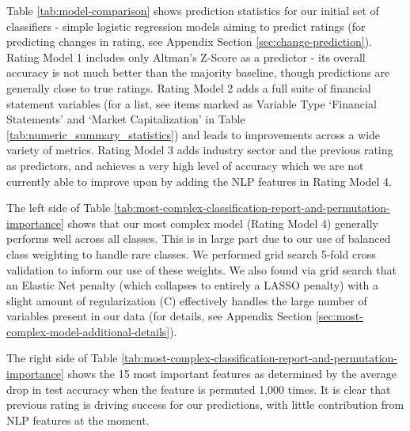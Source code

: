 \documentclass{article}[11pt]
\begin{document}
    Table \ref{tab:model-comparison} shows prediction statistics for our initial set of classifiers - simple logistic regression models aiming to predict ratings (for predicting changes in rating, see Appendix Section \ref{sec:change-prediction}). Rating Model 1 includes only Altman's Z-Score as a predictor - its overall accuracy is not much better than the majority baseline, though predictions are generally close to true ratings. Rating Model 2 adds a full suite of financial statement variables (for a list, see items marked as Variable Type `Financial Statements' and `Market Capitalization' in Table \ref{tab:numeric_summary_statistics}) and leads to improvements across a wide variety of metrics. Rating Model 3 adds industry sector and the previous rating as predictors, and achieves a very high level of accuracy which we are not currently able to improve upon by adding the NLP features in Rating Model 4.

    The left side of Table \ref{tab:most-complex-classification-report-and-permutation-importance} shows that our most complex model (Rating Model 4) generally performs well across all classes. This is in large part due to our use of balanced class weighting to handle rare classes. We performed grid search 5-fold cross validation to inform our use of these weights. We also found via grid search that an Elastic Net penalty (which collapses to entirely a LASSO penalty) with a slight amount of regularization (C) effectively handles the large number of variables present in our data (for details, see Appendix Section \ref{sec:most-complex-model-additional-details}). 
    
    The right side of Table \ref{tab:most-complex-classification-report-and-permutation-importance} shows the 15 most important features as determined by the average drop in test accuracy when the feature is permuted 1,000 times. It is clear that previous rating is driving success for our predictions, with little contribution from NLP features at the moment.


\end{document}
